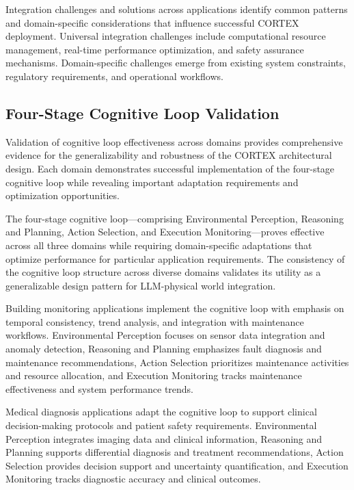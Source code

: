 Integration challenges and solutions across applications identify common patterns and domain-specific considerations that influence successful CORTEX deployment. Universal integration challenges include computational resource management, real-time performance optimization, and safety assurance mechanisms. Domain-specific challenges emerge from existing system constraints, regulatory requirements, and operational workflows.

\subsection{Four-Stage Cognitive Loop Validation}

Validation of cognitive loop effectiveness across domains provides comprehensive evidence for the generalizability and robustness of the CORTEX architectural design. Each domain demonstrates successful implementation of the four-stage cognitive loop while revealing important adaptation requirements and optimization opportunities.

The four-stage cognitive loop—comprising Environmental Perception, Reasoning and Planning, Action Selection, and Execution Monitoring—proves effective across all three domains while requiring domain-specific adaptations that optimize performance for particular application requirements. The consistency of the cognitive loop structure across diverse domains validates its utility as a generalizable design pattern for LLM-physical world integration.

Building monitoring applications implement the cognitive loop with emphasis on temporal consistency, trend analysis, and integration with maintenance workflows. Environmental Perception focuses on sensor data integration and anomaly detection, Reasoning and Planning emphasizes fault diagnosis and maintenance recommendations, Action Selection prioritizes maintenance activities and resource allocation, and Execution Monitoring tracks maintenance effectiveness and system performance trends.

Medical diagnosis applications adapt the cognitive loop to support clinical decision-making protocols and patient safety requirements. Environmental Perception integrates imaging data and clinical information, Reasoning and Planning supports differential diagnosis and treatment recommendations, Action Selection provides decision support and uncertainty quantification, and Execution Monitoring tracks diagnostic accuracy and clinical outcomes.

